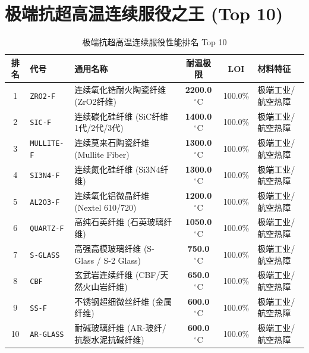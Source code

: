 \documentclass[11pt,openright,twoside,UTF8]{ctexbook}
\begin{document}
\section{极端抗超高温连续服役之王 (Top 10)}
\begin{table}[htbp]
\centering
\small
\caption{极端抗超高温连续服役性能排名 Top 10}
\begin{tabularx}{\textwidth}{cp{2.2cm}p{4.0cm}ccp{3.5cm}}
\toprule
\textbf{排名} & \textbf{代号} & \textbf{通用名称} & \textbf{耐温极限} & \textbf{LOI} & \textbf{材料特征} \\
\midrule
1 & \texttt{ZRO2-F} & 连续氧化锆耐火陶瓷纤维 (ZrO2纤维) & \textbf{2200.0 $^\circ\mathrm{C}$} & 100.0\% & 极端工业/航空热障 \\ 
2 & \texttt{SIC-F} & 连续碳化硅纤维 (SiC纤维 1代/2代/3代) & \textbf{1400.0 $^\circ\mathrm{C}$} & 100.0\% & 极端工业/航空热障 \\ 
3 & \texttt{MULLITE-F} & 连续莫来石陶瓷纤维 (Mullite Fiber) & \textbf{1300.0 $^\circ\mathrm{C}$} & 100.0\% & 极端工业/航空热障 \\ 
4 & \texttt{SI3N4-F} & 连续氮化硅纤维 (Si3N4纤维) & \textbf{1300.0 $^\circ\mathrm{C}$} & 100.0\% & 极端工业/航空热障 \\ 
5 & \texttt{AL2O3-F} & 连续氧化铝微晶纤维 (Nextel 610/720) & \textbf{1200.0 $^\circ\mathrm{C}$} & 100.0\% & 极端工业/航空热障 \\ 
6 & \texttt{QUARTZ-F} & 高纯石英纤维 (石英玻璃纤维) & \textbf{1050.0 $^\circ\mathrm{C}$} & 100.0\% & 极端工业/航空热障 \\ 
7 & \texttt{S-GLASS} & 高强高模玻璃纤维 (S-Glass / S-2 Glass) & \textbf{750.0 $^\circ\mathrm{C}$} & 100.0\% & 极端工业/航空热障 \\ 
8 & \texttt{CBF} & 玄武岩连续纤维 (CBF/天然火山岩纤维) & \textbf{650.0 $^\circ\mathrm{C}$} & 100.0\% & 极端工业/航空热障 \\ 
9 & \texttt{SS-F} & 不锈钢超细微丝纤维 (金属纤维) & \textbf{600.0 $^\circ\mathrm{C}$} & 100.0\% & 极端工业/航空热障 \\ 
10 & \texttt{AR-GLASS} & 耐碱玻璃纤维 (AR-玻纤/抗裂水泥抗碱纤维) & \textbf{600.0 $^\circ\mathrm{C}$} & 100.0\% & 极端工业/航空热障 \\ 
\bottomrule
\end{tabularx}
\end{table}
\end{document}
